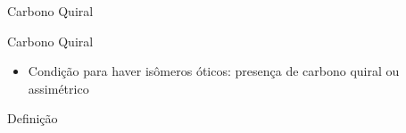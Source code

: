 \documentclass{beamer}
\begin{document}
\begin{frame}[label={sec:org89949d2}]{Carbono Quiral}
\begin{block}{Carbono Quiral}
\begin{itemize}
\item Condição para haver isômeros óticos: presença de carbono \alert{quiral} ou \alert{assimétrico}
\end{itemize}

\begin{bclogo}[couleur=blue!30 , arrondi=0.1 , logo=\bcplume , epBarre=3.5]{Definição}

\end{bclogo}
\end{block}
\end{frame}
\end{document}
